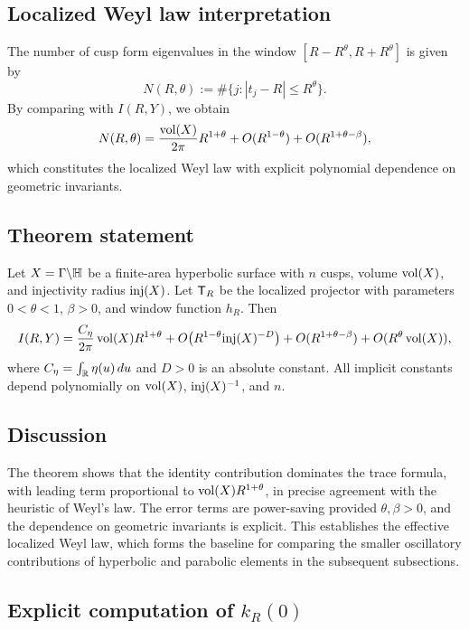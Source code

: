 \subsection{Localized Weyl law interpretation}\label{subsec:identity-weyl-law}

The number of cusp form eigenvalues in the window $[R-R^\theta,R+R^\theta]$ is given by
\[
N(R,\theta) := \#\{ j : |t_j - R| \leq R^\theta \}.
\]
By comparing with $I(R,Y)$, we obtain
\[
N(R,\theta) = \frac{\operatorname{vol}(X)}{2\pi}R^{1+\theta} + O(R^{1-\theta}) + O(R^{1+\theta-\beta}),
\]
which constitutes the localized Weyl law with explicit polynomial dependence on geometric invariants.

\subsection{Theorem statement}\label{subsec:identity-theorem}

\begin{theorem}\label{thm:identity}
Let $X=\Gamma\backslash\mathbb{H}$ be a finite-area hyperbolic surface with $n$ cusps, volume $\operatorname{vol}(X)$, and injectivity radius $\mathrm{inj}(X)$. Let $\mathsf{T}_R$ be the localized projector with parameters $0<\theta<1$, $\beta>0$, and window function $h_R$. Then
\[
I(R,Y) = \frac{C_\eta}{2\pi}\operatorname{vol}(X)R^{1+\theta} + O\!\left(R^{1-\theta}\mathrm{inj}(X)^{-D}\right) + O(R^{1+\theta-\beta}) + O(R^\theta\operatorname{vol}(X)),
\]
where $C_\eta=\int_{\mathbb{R}} \eta(u)\,du$ and $D>0$ is an absolute constant. All implicit constants depend polynomially on $\operatorname{vol}(X)$, $\mathrm{inj}(X)^{-1}$, and $n$.
\end{theorem}

\subsection{Discussion}\label{subsec:identity-discussion}

The theorem shows that the identity contribution dominates the trace formula, with leading term proportional to $\operatorname{vol}(X)R^{1+\theta}$, in precise agreement with the heuristic of Weyl’s law. The error terms are power-saving provided $\theta,\beta>0$, and the dependence on geometric invariants is explicit. This establishes the effective localized Weyl law, which forms the baseline for comparing the smaller oscillatory contributions of hyperbolic and parabolic elements in the subsequent subsections.

\subsection{Explicit computation of $k_R(0)$}\label{subsec:identity-explicit}

